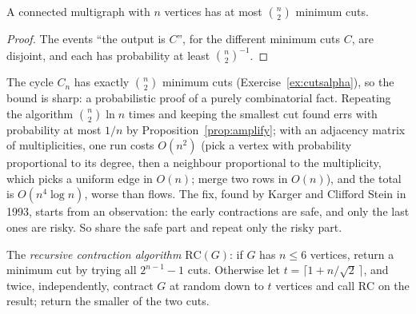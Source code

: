 \begin{corollary}\label{cor:fewmincuts}
A connected multigraph with $n$ vertices has at most $\binom n2$ minimum cuts.
\end{corollary}
\begin{proof}
The events ``the output is $C$'', for the different minimum cuts $C$, are disjoint, and each has probability at least $\binom n2^{-1}$.
\end{proof}

The cycle $C_n$ has exactly $\binom n2$ minimum cuts (Exercise~\ref{ex:cutsalpha}), so the bound is sharp: a probabilistic proof of a purely combinatorial fact. Repeating the algorithm $\binom n2\ln n$ times and keeping the smallest cut found errs with probability at most $1/n$ by
Proposition~\ref{prop:amplify}; with an adjacency matrix of multiplicities, one run costs $O(n^2)$ (pick a vertex with probability proportional to its degree, then a neighbour proportional to the multiplicity, which picks a uniform edge in $O(n)$; merge two rows in $O(n)$), and the total is $O(n^4\log n)$, worse than flows. The fix, found by Karger and Clifford Stein in 1993, starts from an observation: the early contractions are safe, and only the last ones are risky. So
share the safe part and repeat only the risky part.

The \emph{recursive contraction algorithm} $\mathrm{RC}(G)$: if $G$ has $n\le6$ vertices, return a minimum cut by trying all $2^{n-1}-1$ cuts. Otherwise let $t=\lceil1+n/\sqrt2\,\rceil$, and twice, independently, contract $G$ at random down to $t$ vertices and call $\mathrm{RC}$ on the result;
return the smaller of the two cuts.

